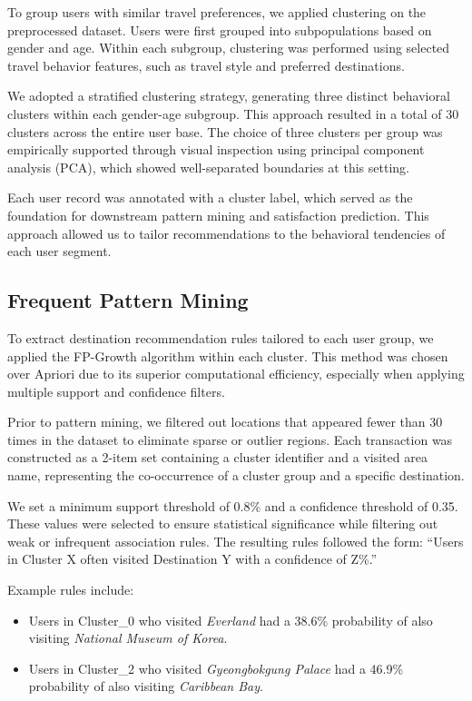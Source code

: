 \documentclass[sigconf]{acmart}
\begin{document}
\begin{CJK}{UTF8}{mj}
To group users with similar travel preferences, we applied clustering on the preprocessed dataset. Users were first grouped into subpopulations based on gender and age. Within each subgroup, clustering was performed using selected travel behavior features, such as travel style and preferred destinations.

We adopted a stratified clustering strategy, generating three distinct behavioral clusters within each gender-age subgroup. This approach resulted in a total of 30 clusters across the entire user base. The choice of three clusters per group was empirically supported through visual inspection using principal component analysis (PCA), which showed well-separated boundaries at this setting.

Each user record was annotated with a cluster label, which served as the foundation for downstream pattern mining and satisfaction prediction. This approach allowed us to tailor recommendations to the behavioral tendencies of each user segment.



\subsection{Frequent Pattern Mining}

To extract destination recommendation rules tailored to each user group, we applied the FP-Growth algorithm within each cluster. This method was chosen over Apriori due to its superior computational efficiency, especially when applying multiple support and confidence filters.

Prior to pattern mining, we filtered out locations that appeared fewer than 30 times in the dataset to eliminate sparse or outlier regions. Each transaction was constructed as a 2-item set containing a cluster identifier and a visited area name, representing the co-occurrence of a cluster group and a specific destination.

We set a minimum support threshold of 0.8\% and a confidence threshold of 0.35. These values were selected to ensure statistical significance while filtering out weak or infrequent association rules. The resulting rules followed the form: “Users in Cluster X often visited Destination Y with a confidence of Z\%.”

Example rules include:
\begin{itemize}
  \item Users in Cluster\_0 who visited \textit{Everland} had a 38.6\% probability of also visiting \textit{National Museum of Korea}.
  \item Users in Cluster\_2 who visited \textit{Gyeongbokgung Palace} had a 46.9\% probability of also visiting \textit{Caribbean Bay}.
\end{itemize}


\end{CJK}
\end{document}
